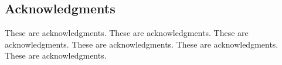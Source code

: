 \documentclass[hyperref]{ctexart}
\begin{document}
\begin{multicols}{2}
    \section*{Acknowledgments}
        These are acknowledgments. These are acknowledgments. These are acknowledgments. These are acknowledgments. These are acknowledgments. These are acknowledgments.
    \begin{thebibliography}{100}%
        
    \end{thebibliography}
    \end{multicols}
\end{document}
